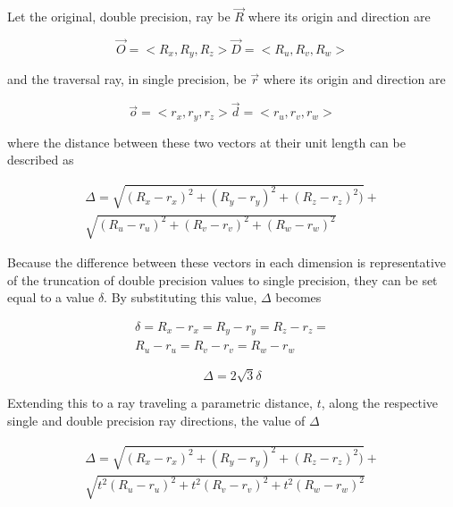 Let the original, double precision, ray be $\vec{R}$ where its origin and direction are

\begin{equation}
  \vec{O} = < R_{x}, R_{y}, R_{z} >
  \vec{D} = < R_{u}, R_{v}, R_{w} >
\end{equation}


and the traversal ray, in single precision, be $\vec{r}$ where its origin and direction are

\begin{equation}
  \vec{o} = < r_{x}, r_{y}, r_{z} >
  \vec{d} = < r_{u}, r_{v}, r_{w} >
\end{equation}


where the distance between these two vectors at their unit length
can be described as

\begin{equation}
  \begin{split}
    \Delta = \sqrt{(R_{x} - r_{x})^{2} + (R_{y} - r_{y})^{2} + (R_{z} - r_{z})^{2})} + \\ \sqrt{ (R_{u} - r_{u})^{2} + (R_{v} - r_{v})^{2} + (R_{w} -
      r_{w})^{2} }
  \end{split}
\end{equation}

Because the difference between these vectors in each dimension is representative
of the truncation of double precision values to single precision, they can be
set equal to a value $\delta$. By substituting this value, $\Delta$ becomes

\begin{equation}
  \begin{split}
    \delta = R_{x} - r_{x} = R_{y} - r_{y} = R_{z} - r_{z} = \\ R_{u} - r_{u} = R_{v} - r_{v} = R_{w} -  r_{w}
  \end{split}
\end{equation}

\begin{equation}
  \Delta = 2\sqrt{3}\delta
\end{equation}

Extending this to a ray traveling a parametric distance, $t$, along the
respective single and double precision ray directions, the value of $\Delta$

\begin{equation}
  \begin{split}
    \Delta = \sqrt{(R_{x} - r_{x})^{2} + (R_{y} - r_{y})^{2} + (R_{z} - r_{z})^{2})} + \\ \sqrt{ t^{2}(R_{u} - r_{u})^{2} + t^{2}(R_{v} - r_{v})^{2} + t^{2}(R_{w} - r_{w})^{2} }
    \end{split}
\end{equation}

